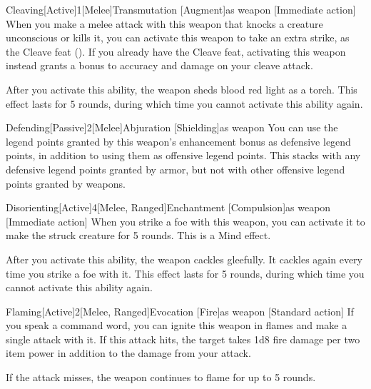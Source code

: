\begin{magicitemdef}{Cleaving}[Active]{1}[Melee]{Transmutation [Augment]}{as weapon}
    [Immediate action] When you make a melee attack with this weapon that knocks a creature unconscious or kills it, you can activate this weapon to take an extra strike, as the Cleave feat ().
    If you already have the Cleave feat, activating this weapon instead grants a  bonus to accuracy and damage on your cleave attack.

    After you activate this ability, the weapon sheds blood red light as a torch.
    This effect lasts for 5 rounds, during which time you cannot activate this ability again.
\end{magicitemdef}

\begin{magicitemdef}{Defending}[Passive]{2}[Melee]{Abjuration [Shielding]}{as weapon}
     You can use the legend points granted by this weapon's enhancement bonus as defensive legend points, in addition to using them as offensive legend points.
    This stacks with any defensive legend points granted by armor, but not with other offensive legend points granted by weapons.
\end{magicitemdef}

\begin{magicitemdef}{Disorienting}[Active]{4}[Melee, Ranged]{Enchantment [Compulsion]}{as weapon}
    [Immediate action] When you strike a foe with this weapon, you can activate it to make the struck creature \disoriented for 5 rounds.
    This is a Mind effect.

    After you activate this ability, the weapon cackles gleefully.
    It cackles again every time you strike a foe with it.
    This effect lasts for 5 rounds, during which time you cannot activate this ability again.
\end{magicitemdef}

\begin{magicitemdef}{Flaming}[Active]{2}[Melee, Ranged]{Evocation [Fire]}{as weapon}
    [Standard action] If you speak a command word, you can ignite this weapon in flames and make a single attack with it. If this attack hits, the target takes 1d8 fire damage per two item power in addition to the damage from your attack.

    If the attack misses, the weapon continues to flame for up to 5 rounds.
\end{magicitemdef}

